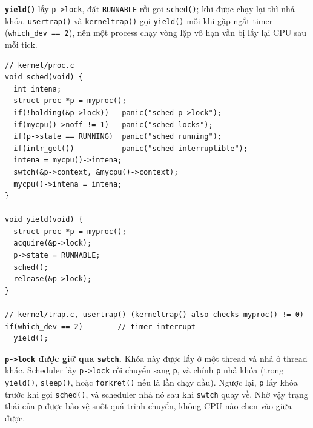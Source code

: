 \textbf{\texttt{yield()}} lấy \texttt{p->lock}, đặt \texttt{RUNNABLE} rồi gọi \texttt{sched()}; khi được chạy lại thì nhả khóa. \texttt{usertrap()} và \texttt{kerneltrap()} gọi \texttt{yield()} mỗi khi gặp ngắt timer (\texttt{which\_dev == 2}), nên một process chạy vòng lặp vô hạn vẫn bị lấy lại CPU sau mỗi tick.

\begin{lstlisting}[style=xv6code]
// kernel/proc.c
void sched(void) {
  int intena;
  struct proc *p = myproc();
  if(!holding(&p->lock))   panic("sched p->lock");
  if(mycpu()->noff != 1)   panic("sched locks");
  if(p->state == RUNNING)  panic("sched running");
  if(intr_get())           panic("sched interruptible");
  intena = mycpu()->intena;
  swtch(&p->context, &mycpu()->context);
  mycpu()->intena = intena;
}

void yield(void) {
  struct proc *p = myproc();
  acquire(&p->lock);
  p->state = RUNNABLE;
  sched();
  release(&p->lock);
}

// kernel/trap.c, usertrap() (kerneltrap() also checks myproc() != 0)
if(which_dev == 2)        // timer interrupt
  yield();
\end{lstlisting}

\textbf{\texttt{p->lock} được giữ qua \texttt{swtch}.} Khóa này được lấy ở một thread và nhả ở thread khác. Scheduler lấy \texttt{p->lock} rồi chuyển sang \texttt{p}, và chính \texttt{p} nhả khóa (trong \texttt{yield()}, \texttt{sleep()}, hoặc \texttt{forkret()} nếu là lần chạy đầu). Ngược lại, \texttt{p} lấy khóa trước khi gọi \texttt{sched()}, và scheduler nhả nó sau khi \texttt{swtch} quay về. Nhờ vậy trạng thái của \texttt{p} được bảo vệ suốt quá trình chuyển, không CPU nào chen vào giữa được.
